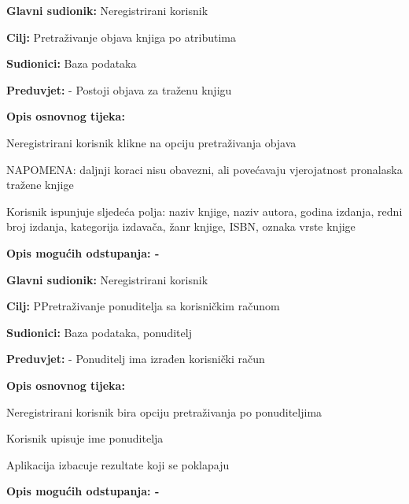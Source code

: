                     \noindent {}
					\begin{packed_item}
	
						\item \textbf{Glavni sudionik: } Neregistrirani korisnik
						\item  \textbf{Cilj:} Pretraživanje objava knjiga po atributima
						\item  \textbf{Sudionici:} Baza podataka
						\item  \textbf{Preduvjet:} - Postoji objava za traženu knjigu
						\item  \textbf{Opis osnovnog tijeka:}
						
						\item[] \begin{packed_enum}
	
							\item Neregistrirani korisnik klikne na opciju pretraživanja objava
                            \item NAPOMENA: daljnji koraci nisu obavezni, ali povećavaju vjerojatnost pronalaska tražene knjige
							\item Korisnik ispunjuje sljedeća polja: naziv knjige, naziv autora, godina izdanja, redni broj izdanja, kategorija izdavača, žanr knjige, ISBN, oznaka vrste knjige
						\end{packed_enum}
						
						\item  \textbf{Opis mogućih odstupanja: -}
					\end{packed_item}

                    \noindent {}
					\begin{packed_item}
	
						\item \textbf{Glavni sudionik: } Neregistrirani korisnik
						\item  \textbf{Cilj:} PPretraživanje ponuditelja sa korisničkim računom
						\item  \textbf{Sudionici:} Baza podataka, ponuditelj
						\item  \textbf{Preduvjet:} - Ponuditelj ima izrađen korisnički račun
						\item  \textbf{Opis osnovnog tijeka:}
						
						\item[] \begin{packed_enum}
	
							\item Neregistrirani korisnik bira opciju pretraživanja po ponuditeljima
                            \item Korisnik upisuje ime ponuditelja
							\item Aplikacija izbacuje rezultate koji se poklapaju
						\end{packed_enum}
						
						\item  \textbf{Opis mogućih odstupanja: -}
					\end{packed_item}
				

